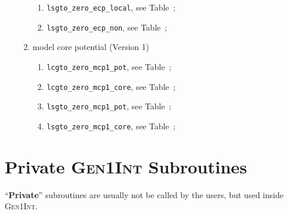\documentclass[a4paper,11pt,twoside,openright]{book}
\begin{document}
\begin{enumerate}
\begin{enumerate}
\begin{enumerate}
      \item \verb|lsgto_zero_ecp_local|, see Table~;
      \item \verb|lsgto_zero_ecp_non|, see Table~;
    \end{enumerate}
    \item model core potential (Version 1)
    \begin{enumerate}
      \item \verb|lcgto_zero_mcp1_pot|, see Table~;
      \item \verb|lcgto_zero_mcp1_core|, see Table~;
      \item \verb|lsgto_zero_mcp1_pot|, see Table~;
      \item \verb|lsgto_zero_mcp1_core|, see Table~;
    \end{enumerate}  
  \end{enumerate}
\end{enumerate}

\section{Private \textsc{Gen1Int} Subroutines}
\label{sect:private-sub}

``\textbf{Private}'' subroutines are usually not be called by the users, but used inside \textsc{Gen1Int}.
\end{document}
